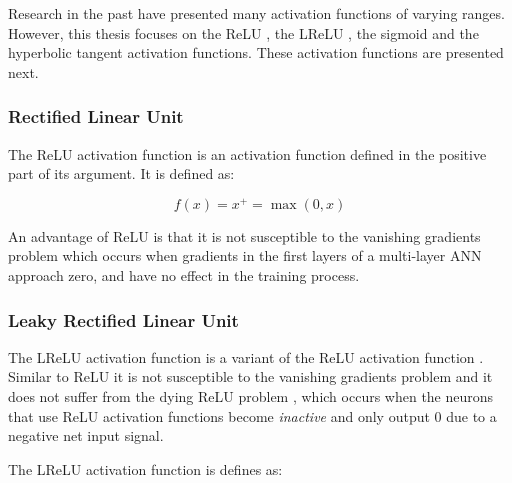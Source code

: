 \noindent Research in the past have presented many activation functions \cite{ref:karlik:2011} of varying ranges. However,
this thesis focuses on the \ac{ReLU} \cite{ref:jarrett:2009, ref:nair:2010}, the
\ac{LReLU} \cite{ref:maas:2013}, the sigmoid \cite{ref:lecun:1988} and the
hyperbolic tangent \cite{ref:lin:2008} activation functions. These activation
functions are presented next.


\subsubsection{Rectified Linear Unit}
\label{sec:anns:an:act_functions:relu}

The \ac{ReLU} activation function is an
activation function defined in the positive part of
its argument. It is defined as:

\begin{equation}
    f(x) = x^{+} = \max(0,x)
    \label{eq:relu}
\end{equation}

\noindent An advantage of \ac{ReLU} is that it is not susceptible to the
vanishing gradients problem \cite{ref:xu:2015,
ref:maksutov:2018} which occurs when gradients in the first layers of a
multi-layer \ac{ANN} approach zero, and have no effect in the training process.


\subsubsection{Leaky Rectified Linear Unit}
\label{sec:anns:an:act_functions:leaky_relu}

The \ac{LReLU} activation function is a variant of
the \ac{ReLU} activation function \cite{ref:xu:2015}.
Similar to \ac{ReLU} it is not susceptible to the vanishing gradients problem and it does not suffer from the dying \ac{ReLU} problem \cite{ref:agarap:2018}, which occurs when
the neurons that use \ac{ReLU} activation functions
become \textit{inactive} and only output $0$ due to a negative net input signal.

The \ac{LReLU} activation function is defines as:
	
